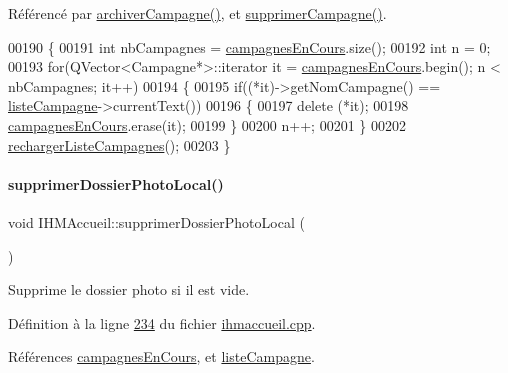 Référencé par \hyperlink{ihmaccueil_8cpp_source_l00350}{archiver\+Campagne()}, et \hyperlink{ihmaccueil_8cpp_source_l00375}{supprimer\+Campagne()}.


\begin{DoxyCode}
00190 \{
00191     \textcolor{keywordtype}{int} nbCampagnes = \hyperlink{class_i_h_m_accueil_ad3827b81480eb201b5927c16a2ad1c46}{campagnesEnCours}.size();
00192     \textcolor{keywordtype}{int} n = 0;
00193     \textcolor{keywordflow}{for}(QVector<Campagne*>::iterator it = \hyperlink{class_i_h_m_accueil_ad3827b81480eb201b5927c16a2ad1c46}{campagnesEnCours}.begin(); n < nbCampagnes; it++)
00194     \{
00195         \textcolor{keywordflow}{if}((*it)->getNomCampagne() == \hyperlink{class_i_h_m_accueil_afb828a4e06c25afa40341c310cd85b08}{listeCampagne}->currentText())
00196         \{
00197             \textcolor{keyword}{delete} (*it);
00198             \hyperlink{class_i_h_m_accueil_ad3827b81480eb201b5927c16a2ad1c46}{campagnesEnCours}.erase(it);
00199         \}
00200         n++;
00201     \}
00202     \hyperlink{class_i_h_m_accueil_a44074f2d8d59e0d1b7a3d50c24d2a0df}{rechargerListeCampagnes}();
00203 \}
\end{DoxyCode}
\mbox{\label{class_i_h_m_accueil_acb9679f51e140e0bc28d8ac10afd87e9}} 
\paragraph{\texorpdfstring{supprimer\+Dossier\+Photo\+Local()}{supprimerDossierPhotoLocal()}}
{\footnotesize\ttfamily void I\+H\+M\+Accueil\+::supprimer\+Dossier\+Photo\+Local (\begin{DoxyParamCaption}{ }\end{DoxyParamCaption})\hspace{0.3cm}{\ttfamily [private]}}



Supprime le dossier photo si il est vide. 



Définition à la ligne \hyperlink{ihmaccueil_8cpp_source_l00234}{234} du fichier \hyperlink{ihmaccueil_8cpp_source}{ihmaccueil.\+cpp}.



Références \hyperlink{ihmaccueil_8h_source_l00039}{campagnes\+En\+Cours}, et \hyperlink{ihmaccueil_8h_source_l00037}{liste\+Campagne}.



